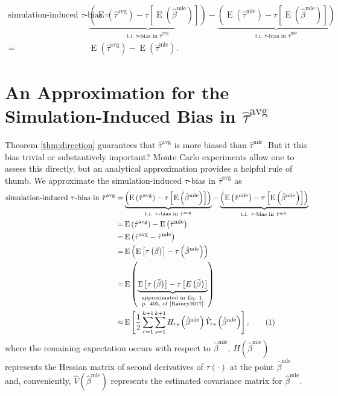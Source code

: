 \documentclass[11pt]{article}
\newcommand\numberthis{\addtocounter{equation}{1}\tag{\theequation}}
\DeclareMathOperator*{\E}{\text{E}}
\begin{document}
\begin{align*}
\text{simulation-induced } \tau\text{-bias} =& \underbrace{ \left( \E \left( \hat{\tau}^\text{avg}\right) - \tau \left[\E \left( \hat{\beta}^\text{mle} \right) \right] \right) }_{\text{t.i. } \tau\text{-bias in }\hat{\tau}^{\text{avg}}} - \underbrace{ \left( \E \left( \hat{\tau}^\text{mle}\right) -  \tau \left[\E \left( \hat{\beta}^\text{mle} \right) \right] \right) }_{\text{t.i. } \tau\text{-bias in }\hat{\tau}^{\text{mle}}} \\
 =& \E \left( \hat{\tau}^\text{avg}\right) - \E \left( \hat{\tau}^\text{mle}\right) .
\end{align*}



\section*{An Approximation for the Simulation-Induced Bias in $\hat{\tau}^\text{avg}$}

Theorem \ref{thm:direction} guarantees that $\hat{\tau}^\text{avg}$ is more biased than $\hat{\tau}^\text{mle}$. But it this bias trivial or substantively important? Monte Carlo experiments allow one to assess this directly, but an analytical approximation provides a helpful rule of thumb.
We approximate the simulation-induced $\tau$-bias in $\hat{\tau}^\text{avg}$ as
\begin{align*}
\text{simulation-induced $\tau$-bias in } \hat{\tau}^\text{avg} =& \underbrace{\left( \E \left( \hat{\tau}^\text{avg}\right) - \tau \left[\E \left( \hat{\beta}^\text{mle} \right) \right] \right) }_{\text{t.i. } \tau\text{-bias in }\hat{\tau}^{\text{avg}}} - \underbrace{ \left( \E \left( \hat{\tau}^\text{mle}\right) -  \tau \left[\E \left( \hat{\beta}^\text{mle} \right) \right] \right)}_{\text{t.i. } \tau\text{-bias in }\hat{\tau}^{\text{mle}}}\\
=& \E \left( \hat{\tau}^\text{avg}\right) - \E \left( \hat{\tau}^\text{mle}\right)\\
=& \E \left( \hat{\tau}^\text{avg} - \hat{\tau}^\text{mle} \right)\\
=& \E \left(     \E \left[ \tau\left( \tilde{\beta} \right) \right]      -      \tau \left( \hat{\beta}^\text{mle} \right)     \right)\\
=& \E \left(     \underbrace{\E \left[ \tau\left( \tilde{\beta} \right) \right]      -      \tau \left[ E\left(  \tilde{\beta} \right)\right]}_{\substack{\text{approximated in Eq. 1,} \\ \text{p. 405, of \cite{Rainey2017}}}}   \right)\\
\approx & \E \left[ \dfrac{1}{2} \displaystyle \sum_{r = 1}^{k+1} \sum_{s = 1}^{k+1} H_{rs}\left( \hat{\beta}^\text{mle} \right) \hat{V}_{rs} \left( \hat{\beta}^{\text{mle}} \right) \right], \numberthis \label{eqn:avg-approx}
\end{align*}
where the remaining expectation occurs with respect to $\hat{\beta}^\text{mle}$, $H\left( \hat{\beta}^\text{mle} \right)$ represents the Hessian matrix of second derivatives of $\tau(\cdot)$ at the point $\hat{\beta}^\text{mle}$ and, conveniently, $\hat{V} \left( \hat{\beta}^{\text{mle}} \right)$ represents the estimated covariance matrix for $\hat{\beta}^\text{mle}$.
\end{document}
